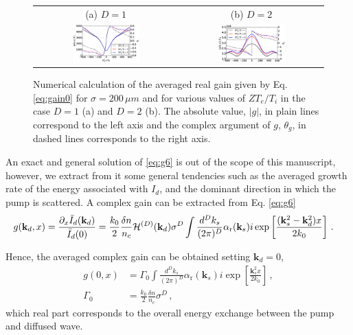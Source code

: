\documentclass[
 reprint,
 amsmath,amssymb,
 aps,
]{revtex4-1}
\begin{document}
\begin{widetext}
 \begin{figure}
\begin{tabular}{cc}
(a) $D=1$ &(b) $D=2$ \\
\includegraphics[width=0.49\textwidth]{int_akin_sin.eps}
 &
\includegraphics[width=0.49\textwidth]{int_akin_sin_D2.eps}
\end{tabular}
\caption{ \label{fig:intakinsin}
Numerical calculation of the averaged real gain given by Eq. \eqref{eq:gain0} for $\sigma = 200 \,\mu m$ and  for various values of $ZT_e/T_i$ in the case $D=1$ (a) and $D=2$ (b). The absolute value, $\vert g \vert $,  in plain lines correspond to the left axis and the complex argument of $g$, $\theta_g$, in dashed lines  corresponds to the right axis.
 }
\end{figure}
An exact and general solution of \eqref{eq:g6} is out of the scope of this manuscript, however, we extract from it some general tendencies such as the averaged growth rate of the energy associated with $I_d$, and the dominant direction in which the pump is scattered. A complex gain can be extracted from  Eq. \eqref{eq:g6}
\begin{align}
&g(\mathbf{k}_d,x) = \frac{\partial_x\Bar{I}_d(\mathbf{k}_d)}{\Bar{I}_d(0)} %
=  \frac{k_0}{2}  \frac{\delta n}{n_c}
 \mathcal{H}^{(D)}(\mathbf{k}_d)  \sigma^D \int \frac{d^Dk_s}{(2\pi)^D}  \alpha_\mathrm{r}(\mathbf{k}_s) 
i\exp\left[ \frac{(\mathbf{k}_s^2-\mathbf{k}_d^2)x}{2k_0}\right]
\, . \label{eq:gainkd}
\end{align}
 \end{widetext}
Hence, the averaged complex gain can be obtained setting $\mathbf{k}_d=0$,
\begin{align}
g(0,x)&=  \Gamma_0 \int \frac{d^Dk_s}{(2\pi)^D}  \alpha_\mathrm{r}(\mathbf{k}_s) 
i\exp\left[ \frac{\mathbf{k}_s^2 x}{2k_0}\right]\, , \nonumber\\
\Gamma_0&=\frac{k_0}{2}  \frac{\delta n}{n_c}
  \sigma^D \, ,
\label{eq:gain0}
\end{align}
which real part corresponds to the overall energy exchange between the pump and diffused wave.
\end{document}
